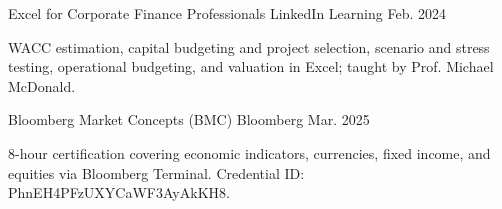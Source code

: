\begin{cventries}
  \cventry
    {Excel for Corporate Finance Professionals} %
    {LinkedIn Learning} %
    {} %
    {Feb. 2024} %
    {
      \begin{cvitems}
        \item {WACC estimation, capital budgeting and project selection, scenario and stress testing, operational budgeting, and valuation in Excel; taught by Prof. Michael McDonald.}
      \end{cvitems}
    }

  \cventry
    {Bloomberg Market Concepts (BMC)} %
    {Bloomberg} %
    {} %
    {Mar. 2025} %
    {
      \begin{cvitems}
        \item {8-hour certification covering economic indicators, currencies, fixed income, and equities via Bloomberg Terminal. Credential ID: PhnEH4PFzUXYCaWF3AyAkKH8.}
      \end{cvitems}
    }

\end{cventries}
